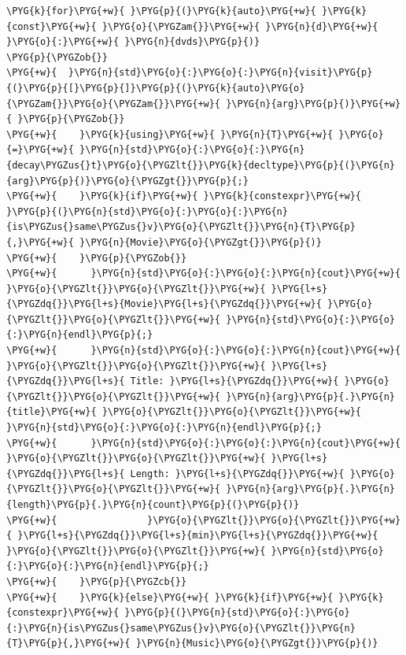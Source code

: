 \begin{itemize}
\begin{codeblockbg}
\begin{Verbatim}[commandchars=\\\{\},breaklines=true,breakanywhere=true,fontsize=\codefont,xleftmargin=17bp]
\PYG{k}{for}\PYG{+w}{ }\PYG{p}{(}\PYG{k}{auto}\PYG{+w}{ }\PYG{k}{const}\PYG{+w}{ }\PYG{o}{\PYGZam{}}\PYG{+w}{ }\PYG{n}{d}\PYG{+w}{ }\PYG{o}{:}\PYG{+w}{ }\PYG{n}{dvds}\PYG{p}{)}
\PYG{p}{\PYGZob{}}
\PYG{+w}{  }\PYG{n}{std}\PYG{o}{:}\PYG{o}{:}\PYG{n}{visit}\PYG{p}{(}\PYG{p}{[}\PYG{p}{]}\PYG{p}{(}\PYG{k}{auto}\PYG{o}{\PYGZam{}}\PYG{o}{\PYGZam{}}\PYG{+w}{ }\PYG{n}{arg}\PYG{p}{)}\PYG{+w}{ }\PYG{p}{\PYGZob{}}
\PYG{+w}{    }\PYG{k}{using}\PYG{+w}{ }\PYG{n}{T}\PYG{+w}{ }\PYG{o}{=}\PYG{+w}{ }\PYG{n}{std}\PYG{o}{:}\PYG{o}{:}\PYG{n}{decay\PYGZus{}t}\PYG{o}{\PYGZlt{}}\PYG{k}{decltype}\PYG{p}{(}\PYG{n}{arg}\PYG{p}{)}\PYG{o}{\PYGZgt{}}\PYG{p}{;}
\PYG{+w}{    }\PYG{k}{if}\PYG{+w}{ }\PYG{k}{constexpr}\PYG{+w}{ }\PYG{p}{(}\PYG{n}{std}\PYG{o}{:}\PYG{o}{:}\PYG{n}{is\PYGZus{}same\PYGZus{}v}\PYG{o}{\PYGZlt{}}\PYG{n}{T}\PYG{p}{,}\PYG{+w}{ }\PYG{n}{Movie}\PYG{o}{\PYGZgt{}}\PYG{p}{)}
\PYG{+w}{    }\PYG{p}{\PYGZob{}}
\PYG{+w}{      }\PYG{n}{std}\PYG{o}{:}\PYG{o}{:}\PYG{n}{cout}\PYG{+w}{ }\PYG{o}{\PYGZlt{}}\PYG{o}{\PYGZlt{}}\PYG{+w}{ }\PYG{l+s}{\PYGZdq{}}\PYG{l+s}{Movie}\PYG{l+s}{\PYGZdq{}}\PYG{+w}{ }\PYG{o}{\PYGZlt{}}\PYG{o}{\PYGZlt{}}\PYG{+w}{ }\PYG{n}{std}\PYG{o}{:}\PYG{o}{:}\PYG{n}{endl}\PYG{p}{;}
\PYG{+w}{      }\PYG{n}{std}\PYG{o}{:}\PYG{o}{:}\PYG{n}{cout}\PYG{+w}{ }\PYG{o}{\PYGZlt{}}\PYG{o}{\PYGZlt{}}\PYG{+w}{ }\PYG{l+s}{\PYGZdq{}}\PYG{l+s}{ Title: }\PYG{l+s}{\PYGZdq{}}\PYG{+w}{ }\PYG{o}{\PYGZlt{}}\PYG{o}{\PYGZlt{}}\PYG{+w}{ }\PYG{n}{arg}\PYG{p}{.}\PYG{n}{title}\PYG{+w}{ }\PYG{o}{\PYGZlt{}}\PYG{o}{\PYGZlt{}}\PYG{+w}{ }\PYG{n}{std}\PYG{o}{:}\PYG{o}{:}\PYG{n}{endl}\PYG{p}{;}
\PYG{+w}{      }\PYG{n}{std}\PYG{o}{:}\PYG{o}{:}\PYG{n}{cout}\PYG{+w}{ }\PYG{o}{\PYGZlt{}}\PYG{o}{\PYGZlt{}}\PYG{+w}{ }\PYG{l+s}{\PYGZdq{}}\PYG{l+s}{ Length: }\PYG{l+s}{\PYGZdq{}}\PYG{+w}{ }\PYG{o}{\PYGZlt{}}\PYG{o}{\PYGZlt{}}\PYG{+w}{ }\PYG{n}{arg}\PYG{p}{.}\PYG{n}{length}\PYG{p}{.}\PYG{n}{count}\PYG{p}{(}\PYG{p}{)}
\PYG{+w}{                }\PYG{o}{\PYGZlt{}}\PYG{o}{\PYGZlt{}}\PYG{+w}{ }\PYG{l+s}{\PYGZdq{}}\PYG{l+s}{min}\PYG{l+s}{\PYGZdq{}}\PYG{+w}{ }\PYG{o}{\PYGZlt{}}\PYG{o}{\PYGZlt{}}\PYG{+w}{ }\PYG{n}{std}\PYG{o}{:}\PYG{o}{:}\PYG{n}{endl}\PYG{p}{;}
\PYG{+w}{    }\PYG{p}{\PYGZcb{}}
\PYG{+w}{    }\PYG{k}{else}\PYG{+w}{ }\PYG{k}{if}\PYG{+w}{ }\PYG{k}{constexpr}\PYG{+w}{ }\PYG{p}{(}\PYG{n}{std}\PYG{o}{:}\PYG{o}{:}\PYG{n}{is\PYGZus{}same\PYGZus{}v}\PYG{o}{\PYGZlt{}}\PYG{n}{T}\PYG{p}{,}\PYG{+w}{ }\PYG{n}{Music}\PYG{o}{\PYGZgt{}}\PYG{p}{)}

\end{Verbatim}
\end{codeblockbg}
\end{itemize}

